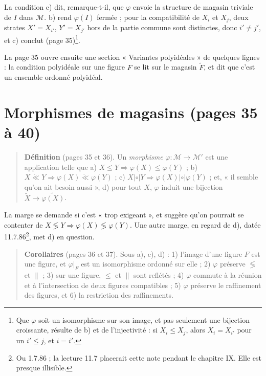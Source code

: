 \documentclass[11pt,a4paper]{article}
\begin{document}
La condition c) dit, remarque-t-il, que $\varphi$ envoie la structure de
magasin triviale de $I$ dans $\mathcal{M}$. b) rend $\varphi(I)$ fermée ; pour
la compatibilité de $X_{i}$ et $X_{j}$, deux strates $X' = X_{i'}$, $Y' =
X_{j'}$ hors de la partie commune sont distinctes, donc $i' \neq j'$, et c)
conclut (page 35)\footnote{Que $\varphi$ soit un isomorphisme sur son image, et
pas seulement une bijection croissante, résulte de b) et de l'injectivité : si
$X_{i} \leq X_{j}$, alors $X_{i} = X_{i'}$ pour un $i' \leq j$, et $i = i'$.}.

La page 35 ouvre ensuite une section « Variantes polyidéales » de quelques
lignes : la condition polyidéale sur une figure $F$ se lit sur le magasin
$\widetilde{F}$, et dit que c'est un ensemble ordonné polyidéal.

\section*{Morphismes de magasins (pages 35 à 40)}

\begin{quote}
\textbf{Définition} (pages 35 et 36). Un \emph{morphisme} $\varphi : \mathcal{M}
\to \mathcal{M}'$ est une application telle que a) $X \leq Y \Rightarrow
\varphi(X) \leq \varphi(Y)$ ; b) $X \mathrel{\mathring{\ll}} Y \Rightarrow
\varphi(X) \mathrel{\mathring{\ll}} \varphi(Y)$ ; c) $X \mathrel{|\circ|} Y
\Rightarrow \varphi(X) \mathrel{|\circ|} \varphi(Y)$ ; et, « il semble qu'on
ait besoin aussi », d) pour tout $X$, $\varphi$ induit une bijection
$\widetilde{X} \to \widetilde{\varphi(X)}$.
\end{quote}

La marge se demande si c'est « trop exigeant », et suggère qu'on pourrait se
contenter de $X \lessgtr Y \Rightarrow \varphi(X) \lessgtr \varphi(Y)$. Une
autre marge, en regard de d), datée 11.7.86\footnote{Ou 1.7.86 ; la lecture
11.7 placerait cette note pendant le chapitre IX. Elle est presque
illisible.}, met d) en question.

\begin{quote}
\textbf{Corollaires} (pages 36 et 37). Sous a), c), d) : 1) l'image d'une
figure $F$ est une figure, et $\varphi|_{F}$ est un isomorphisme ordonné sur
elle ; 2) $\varphi$ préserve $\lessgtr$ et $\parallel$ ; 3) sur une figure,
$\leq$ et $\parallel$ sont reflétés ; 4) $\varphi$ commute à la réunion et à
l'intersection de deux figures compatibles ; 5) $\varphi$ préserve le
raffinement des figures, et 6) la restriction des raffinements.
\end{quote}
\end{document}
